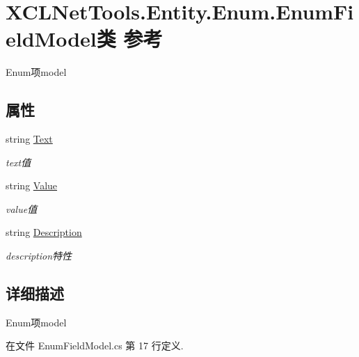 \hypertarget{class_x_c_l_net_tools_1_1_entity_1_1_enum_1_1_enum_field_model}{\section{X\-C\-L\-Net\-Tools.\-Entity.\-Enum.\-Enum\-Field\-Model类 参考}
\label{class_x_c_l_net_tools_1_1_entity_1_1_enum_1_1_enum_field_model}
}


Enum项model  


\subsection*{属性}
\begin{DoxyCompactItemize}
\item 
string \hyperlink{class_x_c_l_net_tools_1_1_entity_1_1_enum_1_1_enum_field_model_afba0a6a9289087c382b5d8050ff4dcd0}{Text}
\begin{DoxyCompactList}\small\item\em text值 \end{DoxyCompactList}\item 
string \hyperlink{class_x_c_l_net_tools_1_1_entity_1_1_enum_1_1_enum_field_model_aa2c519a0507eff410068ee108e7ed845}{Value}
\begin{DoxyCompactList}\small\item\em value值 \end{DoxyCompactList}\item 
string \hyperlink{class_x_c_l_net_tools_1_1_entity_1_1_enum_1_1_enum_field_model_aac9ea6b895da17a78a261f2721a6da08}{Description}
\begin{DoxyCompactList}\small\item\em description特性 \end{DoxyCompactList}\end{DoxyCompactItemize}


\subsection{详细描述}
Enum项model 



在文件 Enum\-Field\-Model.\-cs 第 17 行定义.




